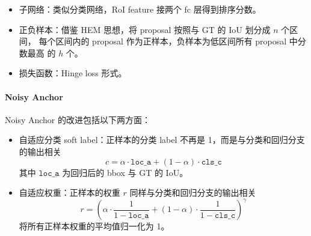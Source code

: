 \begin{itemize}
  \item 子网络：类似分类网络，RoI feature 接两个 fc 层得到排序分数。
  \item 正负样本：借鉴 HEM 思想，将 proposal 按照与 GT 的 IoU 划分成 $n$ 个区间，
    每个区间内的 proposal 作为正样本，负样本为低区间所有 proposal 中分数最高
    的 $h$ 个。
  \item 损失函数：Hinge loss 形式。
\end{itemize}

\paragraph{Noisy Anchor}
Noisy Anchor 的改进包括以下两方面：

\begin{itemize}
  \item 自适应分类 soft label：正样本的分类 label 不再是 1，而是与分类和回归分支
    的输出相关
    \begin{equation}
      c = \alpha \cdot \mathtt{loc\_a} + (1 - \alpha) \cdot \mathtt{cls\_c}
    \end{equation}
    其中 $\mathtt{loc\_a}$ 为回归后的 bbox 与 GT 的 IoU。
  \item 自适应权重：正样本的权重 $r$ 同样与分类和回归分支的输出相关
    \begin{equation}
      r = \left( \alpha \cdot \frac{1}{1-\mathtt{loc\_a}} + (1 - \alpha) \cdot \frac{1}{1-\mathtt{cls\_c}} \right ) ^ {\gamma}
    \end{equation}
    将所有正样本权重的平均值归一化为 1。
\end{itemize}

